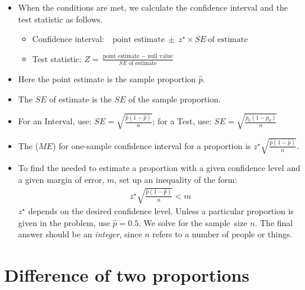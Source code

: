\begin{itemize}
\item When the conditions are met, we calculate the confidence interval and the test statistic as follows.
\begin{itemize}
\item[] Confidence interval:\ \  $\text{point estimate}\ \pm\ z^{\star} \times SE\ \text{of estimate}$
\item[] Test statistic: $Z = \frac{\text{point estimate } - \text{ null value}}{SE \text{ of estimate}}$ 
\end{itemize}
\item[] Here the point estimate is the sample proportion $\hat{p}$.
\item[] The $SE$ of estimate is the $SE$ of the sample proportion.  
\item[] \quad \quad  For an Interval, use:  $SE = \sqrt{\frac{\hat{p}(1-\hat{p})}{n}}$;  \quad for a Test, use:   $SE = \sqrt{\frac{p_0(1-p_0)}{n}}$

\item The  ($ME$) for one-sample confidence interval for a proportion is $z^{\star}\sqrt{\frac{\hat{p}(1-\hat{p})}{n}}$. 
\item To find the  needed to estimate a proportion with a given confidence level and a given margin of error, $m$, set up an inequality of the form:
\begin{align*}
z^{\star}\sqrt{\frac{\hat{p}(1-\hat{p})}{n}}<m
\end{align*}
$z^{\star}$ depends on the desired confidence level.  Unless a particular proportion is given in the problem, use \mbox{$\hat{p}=0.5$.}  We solve for the sample~size $n$.  The final answer should be an \textit{integer}, since $n$ refers to a number of people or things.
\end{itemize}


{}



\section[Difference of two proportions]{Difference of two proportions }
\label{differenceOfTwoProportions}

